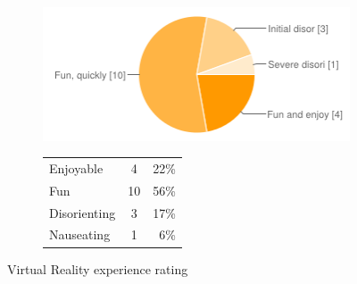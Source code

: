 \documentclass[MSc,paper=a4,pagesize=auto]{icldt}
\begin{document}
\begin{figure}[htbp!]
\centering
\begin{subfigure}{0.4\textwidth}
    \centering
    \includegraphics[width=1\linewidth]{resources/8-demonstration_experience}
\end{subfigure}%
\centering
\begin{subfigure}{\textwidth}
    \centering
   	\begin{tabular}{ l c r }
Enjoyable&4&22\% \\
Fun&10&56\% \\
Disorienting&3&17\% \\
Nauseating&1&6\% \\
\end{tabular}
\end{subfigure} 
    \caption{Virtual Reality experience rating}
    \label{fig:8-demonstration_experience}
\end{figure}
\end{document}
